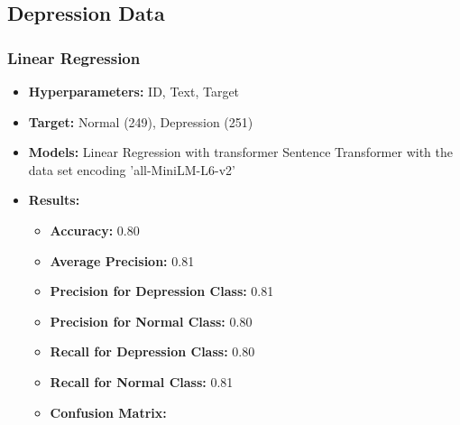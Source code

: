 \documentclass[runningheads,a4paper,11pt]{report}
\begin{document}
\vspace{0.5cm} %

\subsection{Depression Data}
\label{section:depressiondata}

\subsubsection{Linear Regression}
\label{section:regression}

\begin{itemize}
    \item \textbf{Hyperparameters:} ID, Text, Target
    \item \textbf{Target:} Normal (249), Depression (251)
    \item \textbf{Models:} Linear Regression with transformer Sentence Transformer with the data set encoding 'all-MiniLM-L6-v2'
    \item \textbf{Results:}
    \begin{itemize}
        \item \textbf{Accuracy:} 0.80
        \item \textbf{Average Precision:} 0.81
        \item \textbf{Precision for Depression Class:} 0.81
        \item \textbf{Precision for Normal Class:} 0.80
        \item \textbf{Recall for Depression Class:} 0.80
        \item \textbf{Recall for Normal Class:} 0.81
        \item \textbf{Confusion Matrix:}
    \end{itemize}
\end{itemize}
\end{document}
